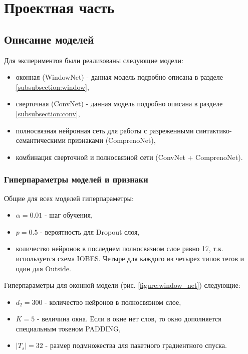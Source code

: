 \chapter{Проектная часть}

\section{Описание моделей} \label{section:models}

Для экспериментов были реализованы следующие модели:
\begin{itemize}
\item оконная (WindowNet) - данная модель подробно описана в разделе \ref{subsubsection:window},
\item сверточная (ConvNet) - данная модель подробно описана в разделе \ref{subsubsection:conv},
\item полносвязная нейронная сеть для работы с разреженными синтактико-семантическими признаками (ComprenoNet),
\item комбинация сверточной и полносвязной сети (ConvNet + ComprenoNet).
\end{itemize}

\subsection{Гиперпараметры моделей и признаки}

Общие для всех моделей гиперпараметры:
\begin{itemize}
\item $\alpha=0.01$ - шаг обучения,
\item $p=0.5$ - вероятность для Dropout слоя,
\item количество нейронов в последнем полносвязном слое равно 17,
т.к. используется схема IOBES. Четыре для каждого из четырех типов тегов и один для Outside.
\end{itemize}

Гиперпараметры для оконной модели (рис. \ref{figure:window_net}) следующие:
\begin{itemize}
\item $d_2 = 300$ - количество нейронов в полносвязном слое,
\item $K=5$ - величина окна. Если в окне нет слов, то окно дополняется специальным токеном PADDING,
\item $|T_s|=32$ - размер подмножества для пакетного градиентного спуска.
\end{itemize}

